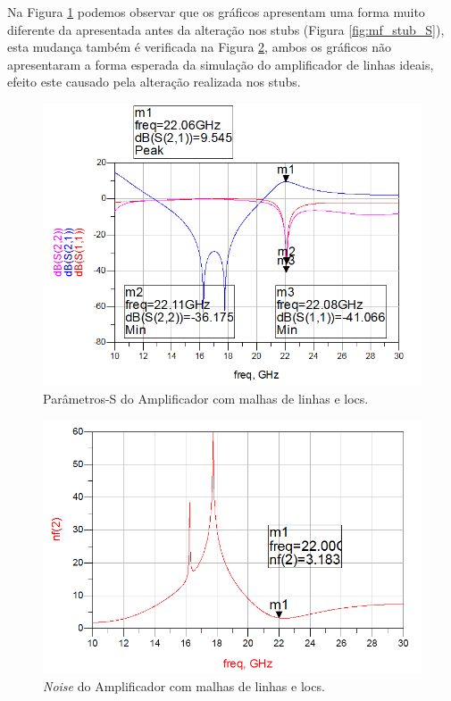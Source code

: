 \documentclass[11pt]{article}
\numberwithin{equation}{section}
\begin{document}
Na Figura \ref{fig:mf_S} podemos observar que os gráficos apresentam uma forma muito diferente da apresentada antes da alteração nos stubs (Figura \ref{fig:mf_stub_S}), esta mudança também é verificada na Figura \ref{fig:mf_noise}, ambos os gráficos não apresentaram a forma esperada da simulação do amplificador de linhas ideais, efeito este causado pela alteração realizada nos stubs.

\begin{figure}[H]
	\centering
	\includegraphics[keepaspectratio=true, scale=0.45]{exps/mf_S}
	\vspace{-0.5em}
	\caption{Parâmetros-S do Amplificador com malhas de linhas e locs.}
	\vspace{-0.8em}
	\label{fig:mf_S}
\end{figure}

\begin{figure}[H]
	\centering
	\includegraphics[keepaspectratio=true, scale=0.45]{exps/mf_noise}
	\vspace{-0.5em}
	\caption{\textit{Noise} do Amplificador com malhas de linhas e locs.}
	\vspace{-0.8em}
	\label{fig:mf_noise}
\end{figure}
\end{document}
